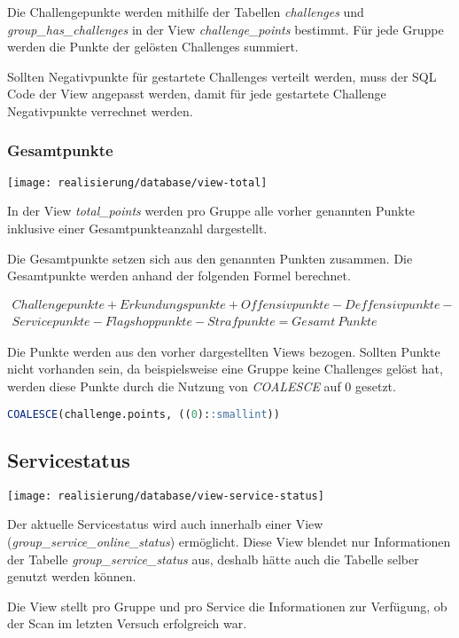 Die Challengepunkte werden mithilfe der Tabellen \textit{challenges} und \textit{group\_has\_challenges} in der View \textit{challenge\_points} bestimmt. Für jede Gruppe werden die Punkte der gelösten Challenges summiert.

Sollten Negativpunkte für gestartete Challenges verteilt werden, muss der SQL Code der View angepasst werden, damit für jede gestartete Challenge Negativpunkte verrechnet werden. 

\subsubsection{Gesamtpunkte}
\begin{center}
	\texttt{[image: realisierung/database/view-total]}
	\label{fig:realisierung-view-total}
\end{center}

In der View \textit{total\_points} werden pro Gruppe alle vorher genannten Punkte inklusive einer Gesamtpunkteanzahl dargestellt. 

Die Gesamtpunkte setzen sich aus den genannten Punkten zusammen. Die Gesamtpunkte werden anhand der folgenden Formel berechnet.

\begin{multline*}
Challengepunkte + Erkundungspunkte + Offensivpunkte - Deffensivpunkte - \\ Servicepunkte - Flagshoppunkte - Strafpunkte = Gesamt~Punkte
\end{multline*}

Die Punkte werden aus den vorher dargestellten Views bezogen. Sollten Punkte nicht vorhanden sein, da beispielsweise eine Gruppe keine Challenges gelöst hat, werden diese Punkte durch die Nutzung von \textit{COALESCE} auf 0 gesetzt.

\begin{lstlisting}[frame=single, language=sql, caption={SQL Ersetzen nicht vorhandener Punkte}, captionpos=b, label={lst:database-total-points-0}]
COALESCE(challenge.points, ((0)::smallint)) 
\end{lstlisting}

\subsection{Servicestatus}
\begin{center}
	\texttt{[image: realisierung/database/view-service-status]}
	\label{fig:realisierung-view-service-status}
\end{center}

Der aktuelle Servicestatus wird auch innerhalb einer View (\textit{group\_service\_online\_status}) ermöglicht. Diese View blendet nur Informationen der Tabelle \textit{group\_service\_status} aus, deshalb hätte auch die Tabelle selber genutzt werden können.

Die View stellt pro Gruppe und pro Service die Informationen zur Verfügung, ob der Scan im letzten Versuch erfolgreich war.